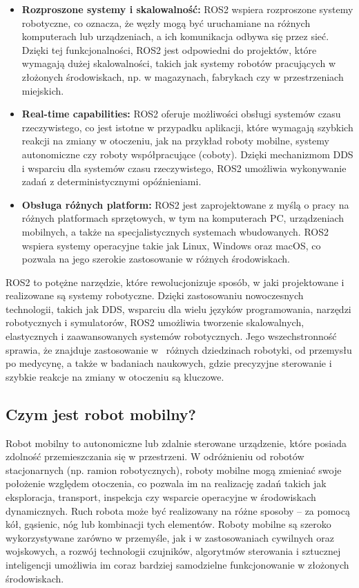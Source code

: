 \documentclass[12pt]{article}
\begin{document}
\begin{itemize}
    \item \textbf{Rozproszone systemy i skalowalność:} ROS2 wspiera rozproszone systemy robotyczne, co oznacza, że węzły mogą być uruchamiane na różnych komputerach lub urządzeniach, a ich komunikacja odbywa się przez sieć. Dzięki tej funkcjonalności, ROS2 jest odpowiedni do projektów, które wymagają dużej skalowalności, takich jak systemy robotów pracujących w złożonych środowiskach, np. w magazynach, fabrykach czy w przestrzeniach miejskich.
    
    \item \textbf{Real-time capabilities:} ROS2 oferuje możliwości obsługi systemów czasu rzeczywistego, co jest istotne w przypadku aplikacji, które wymagają szybkich reakcji na zmiany w otoczeniu, jak na przykład roboty mobilne, systemy autonomiczne czy roboty współpracujące (coboty). Dzięki mechanizmom DDS i wsparciu dla systemów czasu rzeczywistego, ROS2 umożliwia wykonywanie zadań z deterministycznymi opóźnieniami.
    
    \item \textbf{Obsługa różnych platform:} ROS2 jest zaprojektowane z myślą o pracy na różnych platformach sprzętowych, w tym na komputerach PC, urządzeniach mobilnych, a także na specjalistycznych systemach wbudowanych. ROS2 wspiera systemy operacyjne takie jak Linux, Windows oraz macOS, co pozwala na jego szerokie zastosowanie w różnych środowiskach.\\
\end{itemize}

\noindent ROS2 to potężne narzędzie, które rewolucjonizuje sposób, w jaki projektowane i realizowane są systemy robotyczne. Dzięki zastosowaniu nowoczesnych technologii, takich jak DDS, wsparciu dla wielu języków programowania, narzędzi robotycznych i symulatorów, ROS2 umożliwia tworzenie skalowalnych, elastycznych i zaawansowanych systemów robotycznych. Jego wszechstronność sprawia, że znajduje zastosowanie w~ różnych dziedzinach robotyki, od przemysłu po medycynę, a także w badaniach naukowych, gdzie precyzyjne sterowanie i szybkie reakcje na zmiany w otoczeniu są kluczowe.

\subsection{Czym jest robot mobilny?}

Robot mobilny to autonomiczne lub zdalnie sterowane urządzenie, które posiada zdolność przemieszczania się w przestrzeni. W odróżnieniu od robotów stacjonarnych (np. ramion robotycznych), roboty mobilne mogą zmieniać swoje położenie względem otoczenia, co pozwala im na realizację zadań takich jak eksploracja, transport, inspekcja czy wsparcie operacyjne w środowiskach dynamicznych. Ruch robota może być realizowany na różne sposoby – za pomocą kół, gąsienic, nóg lub kombinacji tych elementów. Roboty mobilne są szeroko wykorzystywane zarówno w przemyśle, jak i w zastosowaniach cywilnych oraz wojskowych, a rozwój technologii czujników, algorytmów sterowania i sztucznej inteligencji umożliwia im coraz bardziej samodzielne funkcjonowanie w złożonych środowiskach.
\end{document}
